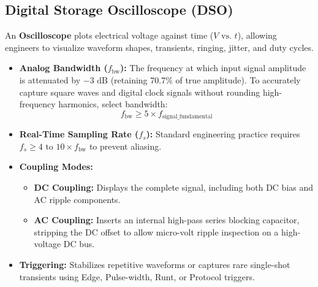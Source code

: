 \subsection{Digital Storage Oscilloscope (DSO)}
An \textbf{Oscilloscope} plots electrical voltage against time ($V \text{ vs. } t$), allowing engineers to visualize waveform shapes, transients, ringing, jitter, and duty cycles.
\begin{itemize}[leftmargin=*]
    \item \textbf{Analog Bandwidth ($f_{\text{bw}}$):} The frequency at which input signal amplitude is attenuated by $-3\text{ dB}$ (retaining 70.7\% of true amplitude). To accurately capture square waves and digital clock signals without rounding high-frequency harmonics, select bandwidth:
    \[
    f_{\text{bw}} \ge 5 \times f_{\text{signal\_fundamental}}
    \]
    \item \textbf{Real-Time Sampling Rate ($f_s$):} Standard engineering practice requires $f_s \ge 4\text{ to }10 \times f_{\text{bw}}$ to prevent aliasing.
    \item \textbf{Coupling Modes:}
    \begin{itemize}
        \item \textbf{DC Coupling:} Displays the complete signal, including both DC bias and AC ripple components.
        \item \textbf{AC Coupling:} Inserts an internal high-pass series blocking capacitor, stripping the DC offset to allow micro-volt ripple inspection on a high-voltage DC bus.
    \end{itemize}
    \item \textbf{Triggering:} Stabilizes repetitive waveforms or captures rare single-shot transients using Edge, Pulse-width, Runt, or Protocol triggers.
\end{itemize}

